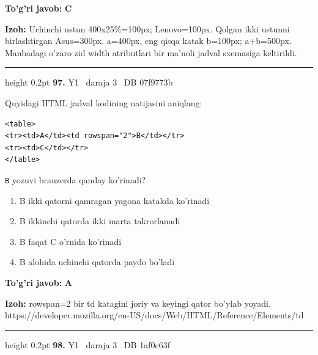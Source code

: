 \documentclass[10pt,a4paper,oneside]{article}
\begin{document}
\begin{tcolorbox}[enhanced,breakable,colback=teal!4,colframe=teal!45!black,boxrule=0.45pt,arc=1.2mm,left=2.8mm,right=2.8mm,top=2mm,bottom=2mm,before skip=2mm,after skip=2mm]
\textbf{\color{teal}To'g'ri javob:} \textbf{C}
\par\smallskip
\textbf{Izoh:} Uchinchi ustun 400x25\%=100px; Lenovo=100px. Qolgan ikki ustunni birlashtirgan Asus=300px. a=400px, eng qisqa katak b=100px; a+b=500px. Manbadagi o'zaro zid width atributlari bir ma'noli jadval sxemasiga keltirildi.
\end{tcolorbox}
\vspace{2mm}\hrule height 0.2pt \vspace{4mm}
\hypertarget{q97}{\textbf{\color{ink}97.}}  {\color{muted}\scriptsize Y1 \textbullet\ daraja 3 \textbullet\ DB 07f9773b}
\par
Quyidagi HTML jadval kodining natijasini aniqlang:\par
\begin{lstlisting}
<table>
<tr><td>A</td><td rowspan="2">B</td></tr>
<tr><td>C</td></tr>
</table>
\end{lstlisting}
\par
\texttt{B} yozuvi brauzerda qanday ko'rinadi?
\begin{enumerate}[label=\Alph*),leftmargin=9mm]
\item B ikki qatorni qamragan yagona katakda ko'rinadi
\item B ikkinchi qatorda ikki marta takrorlanadi
\item B faqat C o'rnida ko'rinadi
\item B alohida uchinchi qatorda paydo bo'ladi
\end{enumerate}
\begin{tcolorbox}[enhanced,breakable,colback=teal!4,colframe=teal!45!black,boxrule=0.45pt,arc=1.2mm,left=2.8mm,right=2.8mm,top=2mm,bottom=2mm,before skip=2mm,after skip=2mm]
\textbf{\color{teal}To'g'ri javob:} \textbf{A}
\par\smallskip
\textbf{Izoh:} rowspan=2 bir td katagini joriy va keyingi qator bo'ylab yoyadi. https://developer.mozilla.org/en-US/docs/Web/HTML/Reference/Elements/td
\end{tcolorbox}
\vspace{2mm}\hrule height 0.2pt \vspace{4mm}
\hypertarget{q98}{\textbf{\color{ink}98.}}  {\color{muted}\scriptsize Y1 \textbullet\ daraja 3 \textbullet\ DB 1af0c63f}
\par
\end{document}
